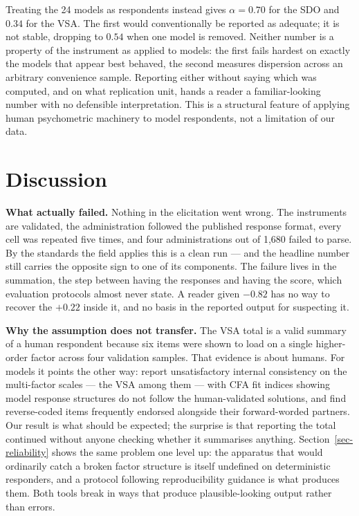 \documentclass{article}
\begin{document}
Treating the 24 models as respondents instead gives \(\alpha = 0.70\)
for the SDO and \(0.34\) for the VSA. The first would conventionally be
reported as adequate; it is not stable, dropping to \(0.54\) when one
model is removed. Neither number is a property of the instrument as
applied to models: the first fails hardest on exactly the models that
appear best behaved, the second measures dispersion across an arbitrary
convenience sample. Reporting either without saying which was computed,
and on what replication unit, hands a reader a familiar-looking number
with no defensible interpretation. This is a structural feature of
applying human psychometric machinery to model respondents, not a
limitation of our data.

\section{Discussion}\label{discussion}

\textbf{What actually failed.} Nothing in the elicitation went wrong.
The instruments are validated, the administration followed the published
response format, every cell was repeated five times, and four
administrations out of 1,680 failed to parse. By the standards the field
applies this is a clean run --- and the headline number still carries
the opposite sign to one of its components. The failure lives in the
summation, the step between having the responses and having the score,
which evaluation protocols almost never state. A reader given \(-0.82\)
has no way to recover the \(+0.22\) inside it, and no basis in the
reported output for suspecting it.

\textbf{Why the assumption does not transfer.} The VSA total is a valid
summary of a human respondent because six items were shown to load on a
single higher-order factor across four validation samples. That evidence
is about humans. For models it points the other way:
\citet{einwiller2026} report unsatisfactory internal consistency on the
multi-factor scales --- the VSA among them --- with CFA fit indices
showing model response structures do not follow the human-validated
solutions, and \citet{suhr2025} find reverse-coded items frequently
endorsed alongside their forward-worded partners. Our result is what
should be expected; the surprise is that reporting the total continued
without anyone checking whether it summarises anything.
Section~\ref{sec-reliability} shows the same problem one level up: the
apparatus that would ordinarily catch a broken factor structure is
itself undefined on deterministic responders, and a protocol following
reproducibility guidance is what produces them. Both tools break in ways
that produce plausible-looking output rather than errors.
\end{document}
